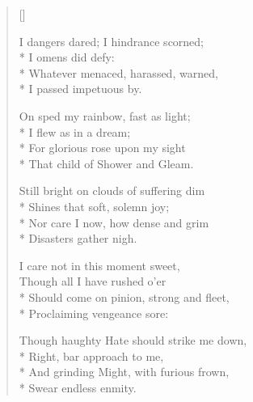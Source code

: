\begin{verse}[\versewidth]
{I dangers dared; I hindrance scorned;\\*
\hspace*{0.333em}\hspace*{0.333em} I omens did defy:\\*
Whatever menaced, harassed, warned,\\*
\hspace*{0.333em}\hspace*{0.333em} I passed impetuous by.

On sped my rainbow, fast as light;\\*
\hspace*{0.333em}\hspace*{0.333em} I flew as in a dream;\\*
For glorious rose upon my sight\\*
\hspace*{0.333em}\hspace*{0.333em} That child of Shower and Gleam.

Still bright on clouds of suffering dim\\*
\hspace*{0.333em}\hspace*{0.333em} Shines that soft, solemn joy;\\*
Nor care I now, how dense and grim\\*
\hspace*{0.333em}\hspace*{0.333em} Disasters gather nigh.

I care not in this moment sweet,\\
\hspace*{0.333em}\hspace*{0.333em} Though all I have rushed o'er\\*
Should come on pinion, strong and fleet,\\*
\hspace*{0.333em}\hspace*{0.333em} Proclaiming vengeance sore:

Though haughty Hate should strike me down,\\*
\hspace*{0.333em}\hspace*{0.333em} Right, bar approach to me,\\*
And grinding Might, with furious frown,\\*
\hspace*{0.333em}\hspace*{0.333em} Swear endless enmity.

}
\end{verse}
